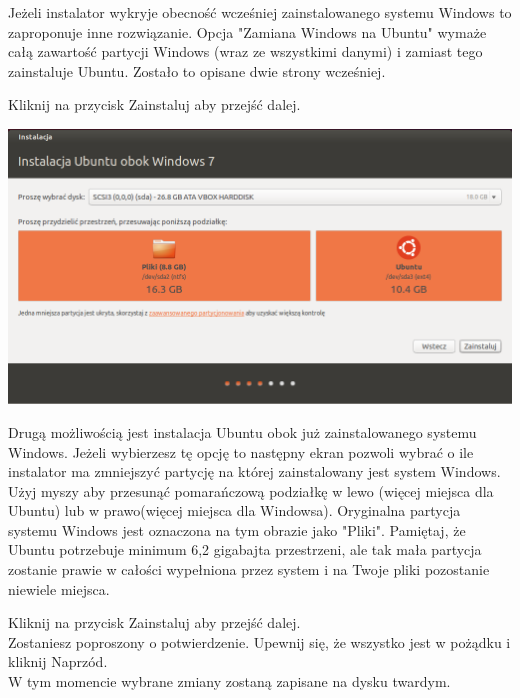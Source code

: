 Jeżeli instalator wykryje obecność wcześniej zainstalowanego systemu Windows to zaproponuje inne rozwiązanie. Opcja "Zamiana Windows na Ubuntu" wymaże całą zawartość partycji Windows (wraz ze wszystkimi danymi) i zamiast tego zainstaluje Ubuntu. Zostało to opisane dwie strony wcześniej.
\begin{flushright}
Kliknij na przycisk \textcolor{ubuntu_orange}{Zainstaluj} aby przejść dalej.
\end{flushright}
\clearpage
\begin{center}
        \includegraphics[width=\linewidth]{images/instalator_partycjonowanie_obok_wondows7_2.png}
\end{center}

Drugą możliwością jest instalacja Ubuntu obok już zainstalowanego systemu Windows. Jeżeli wybierzesz tę opcję to następny ekran pozwoli wybrać o ile instalator ma zmniejszyć partycję na której zainstalowany jest system Windows. Użyj myszy aby przesunąć pomarańczową podziałkę w lewo (więcej miejsca dla Ubuntu) lub w prawo(więcej miejsca dla Windowsa). Oryginalna partycja systemu Windows jest oznaczona na tym obrazie jako "Pliki". Pamiętaj, że Ubuntu potrzebuje minimum 6,2 gigabajta przestrzeni, ale tak mała partycja zostanie prawie w całości wypełniona przez system i na Twoje pliki pozostanie niewiele miejsca.
\begin{flushright}
Kliknij na przycisk \textcolor{ubuntu_orange}{Zainstaluj} aby przejść dalej.\\
Zostaniesz poproszony o potwierdzenie. Upewnij się, że wszystko jest w pożądku i kliknij \textcolor{ubuntu_orange}{Naprzód}.\\
W tym momencie wybrane zmiany zostaną zapisane na dysku twardym.
\end{flushright}
\clearpage
